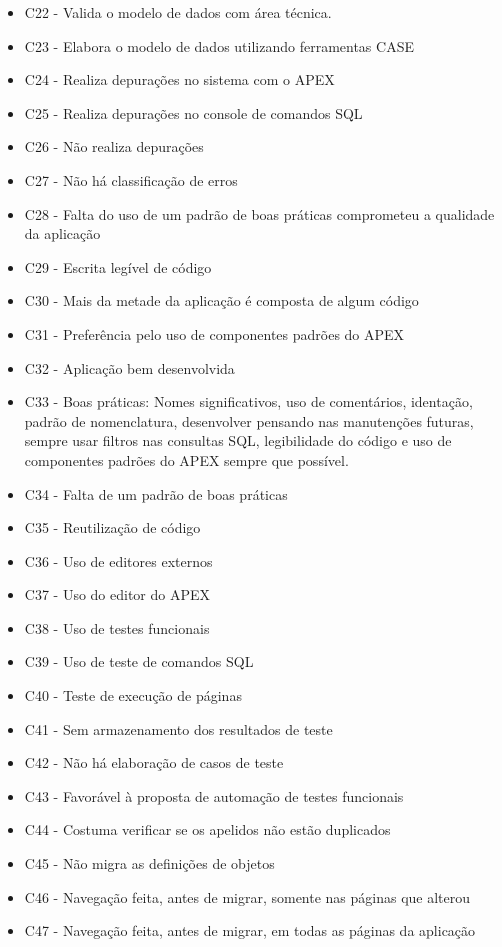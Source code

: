 \begin{itemize}
\item C22 - Valida o modelo de dados com área técnica.
\item C23 - Elabora o modelo de dados utilizando ferramentas CASE
\item C24 - Realiza depurações no sistema com o APEX
\item C25 - Realiza depurações no console de comandos SQL
\item C26 - Não realiza depurações
\item C27 - Não há classificação de erros
\item C28 - Falta do uso de um padrão de boas práticas comprometeu a qualidade da aplicação
\item C29 - Escrita legível de código
\item C30 - Mais da metade da aplicação é composta de algum código
\item C31 - Preferência pelo uso de componentes padrões do APEX
\item C32 - Aplicação bem desenvolvida
\item C33 - Boas práticas: Nomes significativos, uso de comentários, identação, padrão de nomenclatura, desenvolver pensando nas manutenções futuras, sempre usar filtros nas consultas SQL, legibilidade do código e uso de componentes padrões do APEX sempre que possível.
\item C34 - Falta de um padrão de boas práticas
\item C35 - Reutilização de código
\item C36 - Uso de editores externos
\item C37 - Uso do editor do APEX
\item C38 - Uso de testes funcionais
\item C39 - Uso de teste de comandos SQL
\item C40 - Teste de execução de páginas
\item C41 - Sem armazenamento dos resultados de teste
\item C42 - Não há elaboração de casos de teste
\item C43 - Favorável à proposta de automação de testes funcionais
\item C44 - Costuma verificar se os apelidos não estão duplicados
\item C45 - Não migra as definições de objetos
\item C46 - Navegação feita, antes de migrar, somente nas páginas que alterou
\item C47 - Navegação feita, antes de migrar, em todas as páginas da aplicação

\end{itemize}

